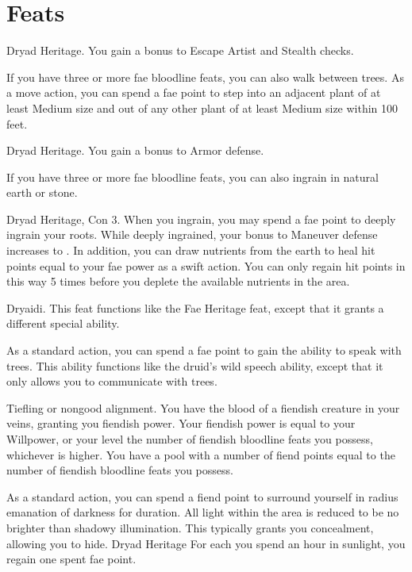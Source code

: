 \section{Feats}

\featpre Dryad Heritage.
\featben You gain a  bonus to Escape Artist and Stealth checks.

If you have three or more fae bloodline feats, you can also walk between trees. As a move action, you can spend a fae point to step into an adjacent plant of at least Medium size and out of any other plant of at least Medium size within 100 feet.

\featpre Dryad Heritage.
\featben You gain a  bonus to Armor defense.

If you have three or more fae bloodline feats, you can also ingrain in natural earth or stone.

\featpres Dryad Heritage, Con 3.
\featben When you ingrain, you may spend a fae point to deeply ingrain your roots. While deeply ingrained, your bonus to Maneuver defense increases to . In addition, you can draw nutrients from the earth to heal hit points equal to your fae power as a swift action. You can only regain hit points in this way 5 times before you deplete the available nutrients in the area.

\featpre Dryaidi.
\featben This feat functions like the Fae Heritage feat, except that it grants a different special ability.

As a standard action, you can spend a fae point to gain the ability to speak with trees. This ability functions like the druid's wild speech ability, except that it only allows you to communicate with trees.

\featpre Tiefling or nongood alignment.
\featben You have the blood of a fiendish creature in your veins, granting you fiendish power.
Your fiendish power is equal to your Willpower, or your level \add the number of fiendish bloodline feats you possess, whichever is higher.
You have a pool with a number of fiend points equal to the number of fiendish bloodline feats you possess.

As a standard action, you can spend a fiend point to surround yourself in \areamed radius emanation of darkness for \durshort duration.
All light within the area is reduced to be no brighter than shadowy illumination.
This typically grants you concealment, allowing you to hide.
\featpre Dryad Heritage
\featben For each you spend an hour in sunlight, you regain one spent fae point.
